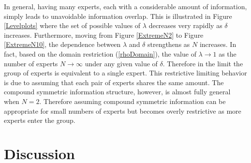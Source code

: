 \documentclass[11pt]{article}
\theoremstyle{definition}
\theoremstyle{definition}
\begin{document}
In general, having many experts, each with a considerable amount of information, simply leads to unavoidable information overlap. This is illustrated in Figure \ref{Levelplots} where the set of possible values of $\lambda$ decreases very rapidly as $\delta$ increases. Furthermore, moving from Figure \ref{ExtremeN2} to Figure \ref{ExtremeN10}, the dependence between $\lambda$ and $\delta$ strengthens as $N$ increases. In fact, based on the domain restriction  (\ref{rhoDomain}), the value of $\lambda \to 1$ as the number of experts $N \to \infty$ under any given value of $\delta$. Therefore in the limit the group of experts is equivalent to a single expert. This restrictive limiting behavior is due to assuming that each pair of experts shares the same amount. The compound symmetric information structure, however, is almost fully general when $N = 2$. Therefore assuming compound symmetric information can be appropriate for small numbers of experts but becomes overly restrictive as more experts enter the group. 


\section{Discussion}



\end{document}
